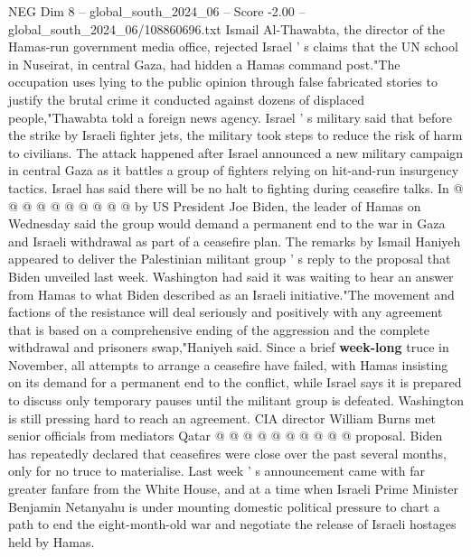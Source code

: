 \begin{textsample}{NEG Dim 8 – global\_south\_2024\_06 – Score -2.00 – global\_south\_2024\_06/108860696.txt}
Ismail Al-Thawabta, the director of the Hamas-run government media office, rejected Israel ' s claims that the UN school in Nuseirat, in central Gaza, had hidden a Hamas command post."The occupation uses lying to the public opinion through false fabricated stories to justify the brutal crime it conducted against dozens of displaced people,"Thawabta told a foreign news agency.
Israel ' s military said that before the strike by Israeli fighter jets, the military took steps to reduce the risk of harm to civilians.
The attack happened after Israel announced a new military campaign in central Gaza as it battles a group of fighters relying on hit-and-run insurgency tactics.
Israel has said there will be no halt to fighting during ceasefire talks.
In @ @ @ @ @ @ @ @ @ @ by US President Joe Biden, the leader of Hamas on Wednesday said the group would demand a permanent end to the war in Gaza and Israeli withdrawal as part of a ceasefire plan.
The remarks by Ismail Haniyeh appeared to deliver the Palestinian militant group ' s reply to the proposal that Biden unveiled last week.
Washington had said it was waiting to hear an answer from Hamas to what Biden described as an Israeli initiative."The movement and factions of the resistance will deal seriously and positively with any agreement that is based on a comprehensive ending of the aggression and the complete withdrawal and prisoners swap,"Haniyeh said.
Since a brief \textbf{week-long} truce in November, all attempts to arrange a ceasefire have failed, with Hamas insisting on its demand for a permanent end to the conflict, while Israel says it is prepared to discuss only temporary pauses until the militant group is defeated.
Washington is still pressing hard to reach an agreement.
CIA director William Burns met senior officials from mediators Qatar @ @ @ @ @ @ @ @ @ @ proposal.
Biden has repeatedly declared that ceasefires were close over the past several months, only for no truce to materialise.
Last week ' s announcement came with far greater fanfare from the White House, and at a time when Israeli Prime Minister Benjamin Netanyahu is under mounting domestic political pressure to chart a path to end the eight-month-old war and negotiate the release of Israeli hostages held by Hamas.

\end{textsample}
